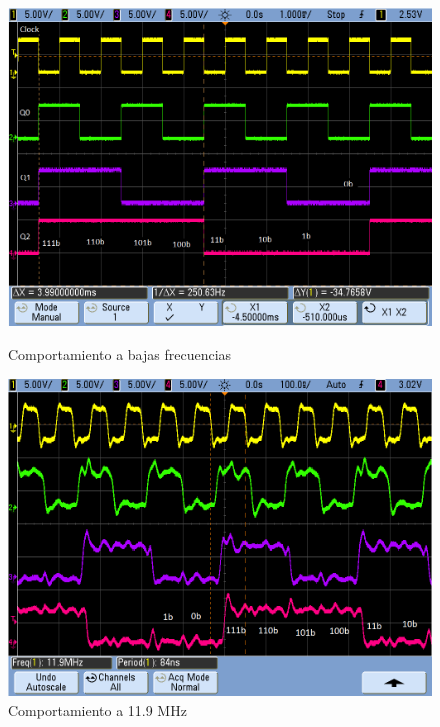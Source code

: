 \begin{figure}[H]
\begin{center}
  \begin{minipage}[b]{0.4\textwidth}
  	\begin{center}
  		\includegraphics[scale=0.2]{ejercicio7/imagenes/async.png}
  	\end{center}
  \caption{Comportamiento a bajas frecuencias}
  \label{7_fig4}
  \end{minipage}
  \begin{minipage}[b]{0.4\textwidth}
  	\begin{center}
  		\includegraphics[scale=0.2]{ejercicio7/imagenes/async2.png}
  	\end{center}
  \caption{Comportamiento a 11.9 MHz}
  \label{7_fig5}
  \end{minipage}
\end{center}
\end{figure}
  
